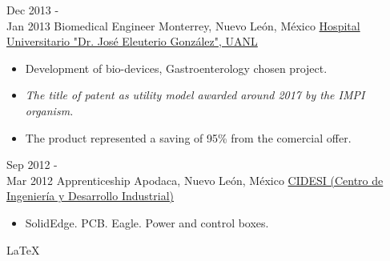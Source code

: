 \documentclass[a4paper]{twentysecondcv} %
\begin{document}
\begin{twenty}
     \twentyitem
        {Dec 2013 - \\ Jan 2013}
        {Biomedical Engineer }
        {Monterrey, Nuevo Le\'on, M\'exico}
        {\href{http://www.medicina.uanl.mx/servicios-y-departamentos/servicios-clinicos/gastroenterologia/}{Hospital Universitario "Dr. Jos\'e Eleuterio Gonz\'alez", UANL}}
        {
        \begin{itemize}
        \item Development of bio-devices, Gastroenterology chosen project.    
        \item
        \textit{The title of patent as utility model awarded around 2017 by the IMPI organism.}
        \item The product represented a saving of 95\% from the comercial offer.
        \end{itemize}
    	}
        
	\twentyitem
		{Sep 2012 - \\ Mar 2012}
		{Apprenticeship}
		{Apodaca, Nuevo Le\'on,  M\'exico}
		{\href{http://www.cidesi.com/}{CIDESI (Centro de Ingeniería y Desarrollo Industrial)}}
		{
		\begin{itemize}
		\item SolidEdge. PCB. Eagle. Power and control boxes.
		\end{itemize}
		}
		
	
	
	
\end{twenty}
\begin{center}
\LaTeX
\end{center}
\end{document}
